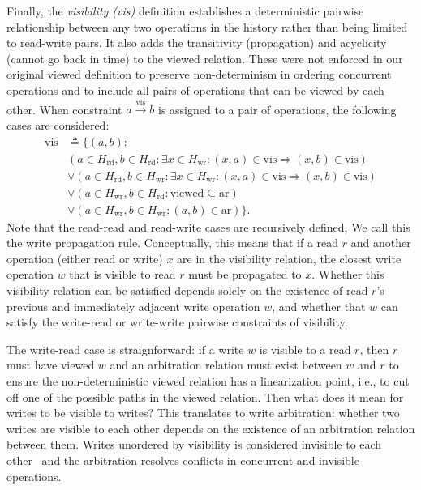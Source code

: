   Finally, the \textit{visibility (vis)} definition establishes a
  deterministic pairwise
  relationship between any two operations in the history
  rather than being limited to read-write pairs.
  It also adds the transitivity (propagation) and acyclicity
  (cannot go back in time) to the viewed relation.
  These were not enforced in our original viewed definition to preserve
  non-determinism in ordering concurrent operations and to include all pairs of
  operations that can be viewed by each other.
  When constraint $a \xrightarrow{\text{vis}} b$ is assigned to a pair
  of operations,
  the following cases are considered:
  \begin{align*}
    \text{vis} & \triangleq \{(a, b) : \\
      & (a \in H_\text{rd}, b \in H_\text{rd} : \exists x \in
      H_\text{wr}: (x, a) \in \text{vis} \Rightarrow (x, b) \in \text{vis}) \\
      & \lor
      (a \in H_\text{rd}, b \in H_\text{wr} : \exists x \in
      H_\text{wr}: (x, a) \in \text{vis} \Rightarrow (x, b) \in \text{vis}) \\
      & \lor
      (a \in H_\text{wr}, b \in H_\text{rd} : \text{viewed} \subseteq
      \text{ar}) \\
      & \lor
    (a \in H_\text{wr}, b \in H_\text{wr} : (a, b) \in \text{ar})\}.
  \end{align*}
  Note that the read-read and read-write cases are recursively
  defined,
  We call this the
  write propagation rule. Conceptually, this means that if a read $r$
  and another operation (either read or write) $x$ are in the
  visibility relation,
  the closest write operation $w$ that is visible to read $r$ must
  be propagated to $x$. Whether this visibility relation can be satisfied
  depends solely on the existence of read $r$'s previous and
  immediately adjacent write operation $w$, and whether
  that $w$ can satisfy the write-read or write-write pairwise
  constraints of visibility.

  The write-read case is straignforward:
  if a write $w$ is visible to a read $r$, then $r$
  must have viewed $w$ and an arbitration relation must exist between
  $w$ and $r$
  to ensure the non-deterministic viewed relation has a
  linearization point, i.e., to cut off one of the possible paths in
  the viewed relation.
  Then what does it mean for writes to be visible to writes? This translates to
  write arbitration: whether two writes are visible to each other depends on the
  existence of an arbitration relation between them.
  Writes unordered by visibility is considered invisible to each
  other~\cite{viotti2016consistency}
  and the arbitration resolves conflicts in concurrent and invisible operations.

